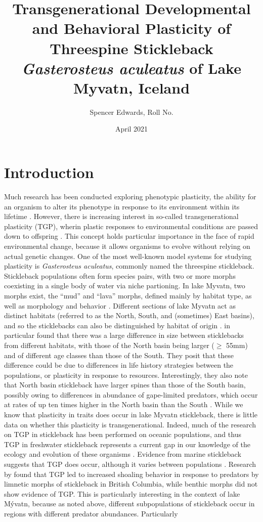 \documentclass[12pt]{extarticle}
\title{Transgenerational Developmental and Behavioral Plasticity of Threespine Stickleback \textit{Gasterosteus aculeatus} of Lake Myvatn, Iceland}
\author{Spencer Edwards, Roll No.}
\date{April 2021}
\begin{document}
\maketitle

\section*{Introduction}
Much research has been conducted exploring phenotypic plasticity, the ability for an organism to alter its phenotype in response to its environment within its lifetime \citep{Denver2010, Kishida2010, Klemetsen2010}. However, there is increasing interest in so-called transgenerational plasticity (TGP), wherin plastic responses to environmental conditions are passed down to offspring \citep{Hellmann2020, Richter-Boix2014, Bell2019, Shama2014}. This concept holds particular importance in the face of rapid environmental change, because it allows organisms to evolve without relying on actual genetic changes. One of the most well-known model systems for studying plasticity is \textit{Gasterosteus aculeatus}, commonly named the threespine stickleback. Stickleback populations often form species pairs, with two or more morphs coexisting in a single body of water via niche partioning. In lake Myvatn, two morphs exist, the ``mud'' and ``lava'' morphs, defined mainly by habitat type, as well as morphology and behavior \citep{Kristjansson2002, Millet2013}. Different sections of lake Myvatn act as distinct habitats (referred to as the North, South, and (sometimes) East basins), and so the sticklebacks can also be distinguished by habitat of origin \citep{Millet2013, Einarsson2004}. \citet{Millet2013} in particular found that there was a large difference in size between sticklebacks from different habitats, with those of the North basin being larger ($\ge$ 55mm) and of different age classes than those of the South. They posit that these difference could be due to differences in life history strategies between the populations, or plasticity in response to resources. Interestingly, they also note that North basin stickleback have larger spines than those of the South basin, possibly owing to differences in abundance of gape-limited predators, which occur at rates of up ten times higher in the North basin than the South \citep{Millet2013}. While we know that plasticity in traits does occur in lake Myvatn stickleback, there is little data on whether this plasticity is transgenerational. Indeed, much of the research on TGP in stickleback has been performed on oceanic populations, and thus TGP in freshwater stickleback represents a current gap in our knowledge of the ecology and evolution of these organisms \citep{Shama2014}. Evidence from marine stickleback suggests that TGP does occur, although it varies between populations \citep{Shama2014, Heckwolf2018, Kozak2012}. Research by \citet{Kozak2012} found that TGP led to increased shoaling behavior in response to predators by limnetic morphs of stickleback in British Columbia, while benthic morphs did not show evidence of TGP. This is particularly interesting in the context of lake M\'yvatn, because as noted above, different subpopulations of stickleback occur in regions with different predator abundances. Particularly 
\end{document}
